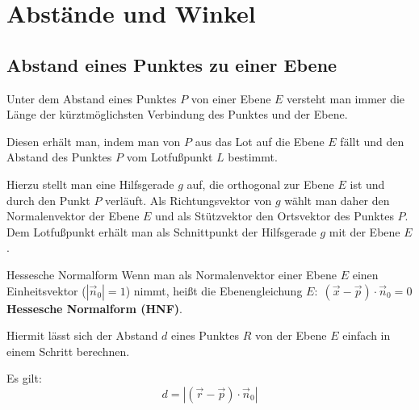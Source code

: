 \documentclass{article}
\begin{document}
\section{Abstände und Winkel}
\subsection{Abstand eines Punktes zu einer Ebene}
Unter dem Abstand eines Punktes $P$ von einer Ebene $E$ versteht man 
immer die Länge der kürztmöglichsten Verbindung des Punktes und der Ebene.

Diesen erhält man, indem man von $P$ aus das Lot auf die Ebene $E$ fällt 
und den Abstand des Punktes $P$ vom Lotfußpunkt $L$ bestimmt.
\begin{figure}[H]
    \centering
\end{figure}
Hierzu stellt man eine Hilfsgerade $g$ auf, die orthogonal zur Ebene $E$ ist
und durch den Punkt $P$ verläuft.
Als Richtungsvektor von $g$ wählt man daher den Normalenvektor der Ebene $E$
und als Stützvektor den Ortsvektor des Punktes $P$.
Dem Lotfußpunkt erhält man als Schnittpunkt der Hilfsgerade $g$ mit der Ebene $E$.
\begin{boxx}[Red]{Hessesche Normalform}
    Wenn man als Normalenvektor einer Ebene $E$ einen Einheitsvektor ($\left|\vec{n}_0\right|=1$) nimmt,
    heißt die Ebenengleichung $\displaystyle E:\; \left(\vec{x}- \vec{p}\right)\cdot \vec{n}_0 = 0$ 
    \textbf{Hessesche Normalform (HNF)}.

    Hiermit lässt sich der Abstand $d$ eines Punktes $R$ von der Ebene $E$ einfach in einem Schritt berechnen.

    Es gilt:
    \[d = \left|\left(\vec{r}-\vec{p}\right)\cdot \vec{n}_0\right|\]
\end{boxx}
\end{document}
